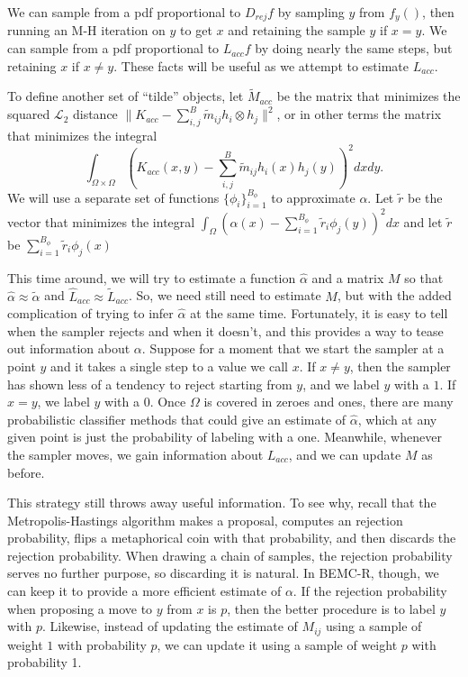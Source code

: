\documentclass{article}
\newcommand\EMK[1]{\textcolor{purple}{EMK: #1}}
\begin{document}
We can sample from a pdf proportional to $D_{rej}f$ by sampling $y$ from $f_y()$, then running an M-H iteration on $y$ to get $x$ and retaining the sample $y$ if $x = y$. We can sample from a pdf proportional to $L_{acc}f$ by doing nearly the same steps, but retaining $x$ if $x \neq y$. These facts will be useful as we attempt to estimate $L_{acc}$.

To define another set of ``tilde'' objects, let  $\tilde{M}_{acc}$ be the matrix that minimizes the squared $\mathcal{L}_2$ distance $\|K_{acc} - \sum_{i,j}^B\tilde{m}_{ij} h_i \otimes h_j\|^2$, or in other terms the matrix that minimizes the integral $$\int_{\Omega\times\Omega}(K_{acc}(x,y) - \sum_{i,j}^B\tilde{m}_{ij} h_i(x)h_j(y))^2dx dy .$$ We will use a separate set of functions $\{\phi_i\}_{i=1}^{B_\phi}$ to approximate $\alpha$. Let $\tilde{r}$ be the vector that minimizes the integral $\int_{\Omega}(\alpha(x) -  \sum_{i=1}^{B_\phi}\tilde{r}_{i} \phi_j(y))^2dx  $ and let $\tilde{r}$ be $\sum_{i=1}^{B_\phi}\tilde{r}_{i} \phi_j(x)$

This time around, we will try to estimate a function $\hat{\alpha}$ and a matrix $M$ so that $\hat{\alpha}\approx \tilde{\alpha}$ and $\hat{L}_{acc} \approx \tilde{L}_{acc}$.%
 So, we need still need to estimate $M$, but with the added complication of trying to infer $\hat{\alpha}$ at the same time. Fortunately, it is easy to tell when the sampler rejects and when it doesn't, and this provides a way to tease out information about $\alpha$. Suppose for a moment that we start the sampler at a point $y$ and it takes a single step to a value we call $x$. If $x\neq y$, then the sampler has shown less of a tendency to reject starting from $y$, and we label $y$ with a $1$. If $x = y$, we label $y$ with a $0$. Once $\Omega$ is covered in zeroes and ones, there are many probabilistic classifier methods that could give an estimate of $\hat{\alpha}$, which at any given point is just the probability of labeling with a one. Meanwhile, whenever the sampler moves, we gain information about $L_{acc}$, and we can update $M$ as before. 

This strategy still throws away useful information. To see why, recall that the Metropolis-Hastings algorithm makes a proposal, computes an rejection probability, flips a metaphorical coin with that probability, and then discards the rejection probability. When drawing a chain of samples, the rejection probability serves no further purpose, so discarding it is natural. In BEMC-R, though, we can keep it to provide a more efficient estimate of $\alpha$. If the rejection probability when proposing a move to $y$ from $x$ is $p$, then the better procedure is to label $y$ with $p$. Likewise, instead of updating the estimate of $M_{ij}$ using a sample of weight $1$ with probability $p$, we can update it using a sample of weight $p$ with probability 1.
\end{document}

